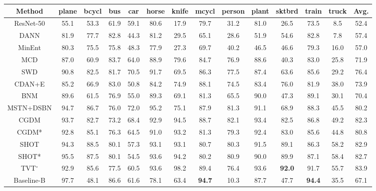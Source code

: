 \documentclass[dvipsnames, svgnames, x11names, table]{article} \usepackage{iclr2022_conference,times}
\begin{document}
\begin{spacing}{1.0}
\begin{table*}[!t]\small
\setlength\tabcolsep{3.4pt}
\begin{tabular}{c|cccccccccccc>{\columncolor{lightgray}}c}
\hline
Method    & plane & bcycl & bus   & car   & horse & knife & mcycl & person & plant & sktbrd & train & truck & Avg.  \\ \hline
ResNet-50    & 55.1  & 53.3    & 61.9  & 59.1  & 80.6  & 17.9  & 79.7  & 31.2   & 81.0  & 26.5       & 73.5  & 8.5   & 52.4 \\
DANN      & 81.9  & 77.7    & 82.8  & 44.3  & 81.2  & 29.5  & 65.1  & 28.6   & 51.9  & 54.6       & 82.8  & 7.8   & 57.4 \\
MinEnt    & 80.3  & 75.5    & 75.8  & 48.3  & 77.9  & 27.3  & 69.7  & 40.2   & 46.5  & 46.6       & 79.3  & 16.0  & 57.0 \\
MCD       & 87.0  & 60.9    & 83.7  & 64.0  & 88.9  & 79.6  & 84.7  & 76.9   & 88.6  & 40.3       & 83.0  & 25.8  & 71.9 \\
SWD       & 90.8  & 82.5    & 81.7  & 70.5  & 91.7  & 69.5  & 86.3  & 77.5   & 87.4  & 63.6       & 85.6  & 29.2  & 76.4 \\
CDAN+E    & 85.2  & 66.9    & 83.0  & 50.8  & 84.2  & 74.9  & 88.1  & 74.5   & 83.4  & 76.0       & 81.9  & 38.0  & 73.9 \\
BNM       & 89.6  & 61.5    & 76.9  & 55.0  & 89.3  & 69.1  & 81.3  & 65.5   & 90.0  & 47.3       & 89.1  & 30.1  & 70.4 \\
MSTN+DSBN & 94.7  & 86.7    & 76.0  & 72.0  & 95.2  & 75.1  & 87.9  & 81.3   & 91.1  & 68.9       & 88.3  & 45.5  & 80.2 \\
CGDM      & 93.7  & 82.7    & 73.2  & 68.4  & 92.9  & 94.5  & 88.7  & 82.1   & 93.4  & 82.5       & 86.8  & 49.2  & 82.3 \\
CGDM*  & 92.8 & 85.1 & 76.3 & 64.5 & 91.0 & 93.2 & 81.3 & 79.3 & 92.4 & 83.0 & 85.6 & 44.8 & 80.8 \\
SHOT      & 94.3  & 88.5    & 80.1  & 57.3  & 93.1  & 93.1  & 80.7  & 80.3   & 91.5  & 89.1   & 86.3  & 58.2  & 82.9 \\ 
SHOT* & 95.5 & 87.5 & 80.1 & 54.5 & 93.6 & 94.2 & 80.2 & 80.9 & 90.0 & 89.9 & 87.1 & 58.4 & 82.7 \\
TVT$^{\circ}$ & 92.9 & 85.6 & 77.5 & 60.5 & 93.6 & 98.2 & 89.4 & 76.4 & 93.6 & \textbf{92.0} & 91.7 & 55.7 & 83.9 \\
\hline
Baseline-B & 97.7 & 48.1 & 86.6 & 61.6 & 78.1 & 63.4 & \textbf{94.7} & 10.3 & 87.7 & 47.7 & \textbf{94.4} & 35.5 & 67.1 \\

\end{tabular}
\end{table*}
\end{spacing}
\end{document}
